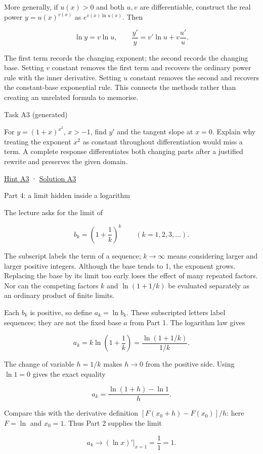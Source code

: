 \documentclass[
  11pt,
]{article}
\providecommand{\gt}{>}
\begin{document}
More generally, if \(u(x)\gt 0\) and both \(u,v\) are differentiable,
construct the real power \(y=u(x)^{v(x)}\) as \(e^{v(x)\ln u(x)}\). Then

\[
\ln y=v\ln u,\qquad
\frac{y'}{y}=v'\ln u+v\frac{u'}u.
\]

The first term records the changing exponent; the second records the
changing base. Setting \(v\) constant removes the first term and
recovers the ordinary power rule with the inner derivative. Setting
\(u\) constant removes the second and recovers the constant-base
exponential rule. This connects the methods rather than creating an
unrelated formula to memorise.

Task A3 (generated)

For \(y=(1+x)^{x^2}\), \(x\gt -1\), find \(y'\) and the tangent slope at
\(x=0\). Explain why treating the exponent \(x^2\) as constant
throughout differentiation would miss a term. A complete response
differentiates both changing parts after a justified rewrite and
preserves the given domain.

\protect\hyperlink{hint-a3}{Hint A3} ·
\protect\hyperlink{solution-a3}{Solution A3}

Part 4: a limit hidden inside a logarithm

The lecture asks for the limit of

\[
b_k=\left(1+\frac1k\right)^k\qquad(k=1,2,3,\ldots).
\]

The subscript labels the term of a sequence; \(k\to\infty\) means
considering larger and larger positive integers. Although the base tends
to 1, the exponent grows. Replacing the base by its limit too early
loses the effect of many repeated factors. Nor can the competing factors
\(k\) and \(\ln(1+1/k)\) be evaluated separately as an ordinary product
of finite limits.

Each \(b_k\) is positive, so define \(a_k=\ln b_k\). These subscripted
letters label sequences; they are not the fixed base \(a\) from Part 1.
The logarithm law gives

\[
a_k=k\ln\left(1+\frac1k\right)
=\frac{\ln(1+1/k)}{1/k}.
\]

The change of variable \(h=1/k\) makes \(h\to0\) from the positive side.
Using \(\ln1=0\) gives the exact equality

\[
a_k=\frac{\ln(1+h)-\ln1}{h}.
\]

Compare this with the derivative definition \([F(x_0+h)-F(x_0)]/h\):
here \(F=\ln\) and \(x_0=1\). Thus Part 2 supplies the limit

\[
a_k\longrightarrow (\ln x)'\big|_{x=1}=\frac11=1.
\]
\end{document}

